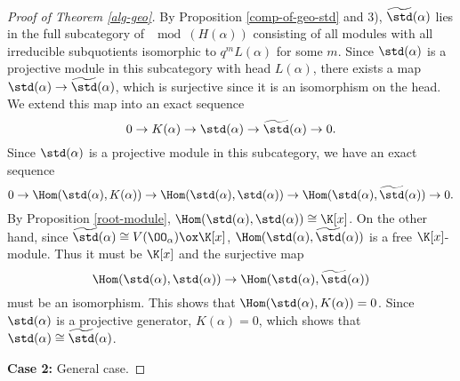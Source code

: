 \begin{proof}[Proof of Theorem \ref{alg-geo}]
    By Proposition \ref{comp-of-geo-std} and 3), 
    $\widetilde{\std}(\alpha)$ lies in the 
    full subcategory of $\mod(H(\alpha))$ consisting of
    all modules with all irreducible subquotients isomorphic
    to $q^mL(\alpha)$ for some $m$. Since $\std(\alpha)$ 
    is a projective module in this subcategory with head $L(\alpha)$,
    there exists a map $\std(\alpha)\to\widetilde{\std}(\alpha)$,
    which is surjective since it is an isomorphism on the head.
    We extend this map into an exact sequence 
    \[
        0\to K(\alpha)\to \std(\alpha)\to\widetilde{\std}(\alpha)\to 0.
    \]
    Since $\std(\alpha)$ is a projective module in this subcategory,
    we have an exact sequence $$0\to\Hom(\std(\alpha),K(\alpha))
    \to\Hom(\std(\alpha),\std(\alpha))
    \to\Hom(\std(\alpha),\widetilde{\std}(\alpha))\to 0.$$
    By Proposition \ref{root-module}, $\Hom(\std(\alpha),\std(\alpha))
    \cong\K[x]$. On the other hand, since $\widetilde{\std}(\alpha)
    \cong V(\OO_\alpha)\ox\K[x]$, $\Hom(\std(\alpha),\widetilde{\std}(\alpha))$
    is a free $\K[x]$-module. Thus it must be $\K[x]$ and the surjective map
    \[
        \Hom(\std(\alpha),\std(\alpha))
        \to\Hom(\std(\alpha),\widetilde{\std}(\alpha))
    \] 
    must be an isomorphism.
    This shows that $ \Hom(\std(\alpha),K(\alpha)) = 0$.
    Since $\std(\alpha)$ is a projective generator, 
    $K(\alpha) = 0$, which shows that 
    $\std(\alpha)\cong\widetilde{\std}(\alpha)$.

    \textbf{Case 2: }General case.


\end{proof}
